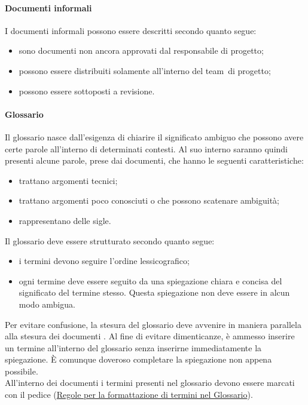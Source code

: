 \documentclass[../NormeProgetto.tex]{subfiles}
\begin{document}
		\paragraph{Documenti informali}
			I documenti informali possono essere descritti secondo quanto segue:
			\begin{itemize}
				\item sono documenti non ancora approvati dal responsabile di progetto;
				\item possono essere distribuiti solamente all'interno del team\g\ di progetto;
				\item possono essere sottoposti a revisione.
			\end{itemize}
		
		\paragraph{Glossario} \label{sec:Glossario}
			Il glossario nasce dall'esigenza di chiarire il significato ambiguo che possono avere certe parole all'interno di determinati contesti. Al suo interno saranno quindi presenti alcune parole, prese dai documenti, che hanno le seguenti caratteristiche:
			\begin{itemize}
				\item trattano argomenti tecnici;
				\item trattano argomenti poco conosciuti o che possono scatenare ambiguità;
				\item rappresentano delle sigle.
			\end{itemize}
			Il glossario deve essere strutturato secondo quanto segue:
			\begin{itemize}
				\item i termini devono seguire l'ordine lessicografico;
				\item ogni termine deve essere seguito da una spiegazione chiara e concisa del significato del termine stesso. Questa spiegazione non deve essere in alcun modo ambigua.
			\end{itemize}
			Per evitare confusione, la stesura del glossario deve avvenire in maniera parallela alla stesura dei documenti . Al fine di evitare dimenticanze, è ammesso inserire un termine all'interno del glossario senza inserirne immediatamente la spiegazione. È comunque doveroso completare la spiegazione non appena possibile. \\ All'interno dei documenti i termini presenti nel glossario devono essere marcati con il pedice \g (\hyperref[sec:Formattazione termini nel glossario]{Regole per la formattazione di termini nel Glossario}).
		
\end{document}
